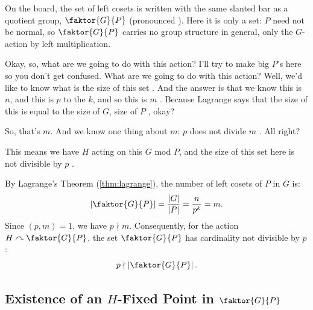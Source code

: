 \begin{proofWrapper}
\begin{aiNote}
On the board, the set of left cosets is written with the same slanted bar as a quotient group, $\faktor{G}{P}$ (pronounced ). Here it is only a set: $P$ need not be normal, so $\faktor{G}{P}$ carries no group structure in general, only the $G$-action by left multiplication.
\end{aiNote}

\begin{speech}[00:22:43 - 00:23:47]
Okay, so, what are we going to do with this action? I'll try to make big $P$'s here so you don't get confused. What are we going to do with this action? Well, we'd like to know what is the size of this set . And the answer is that we know this is $n$, and this is $p$ to the $k$, and so this is $m$ . Because Lagrange says that the size of this is equal to the size of $G$, size of $P$ , okay?

So, that's $m$. And we know one thing about $m$: $p$ does not divide $m$ . All right?

This means we have $H$ acting on this $G$ mod $P$, and the size of this set here is not divisible by $p$ .
\end{speech}

\begin{content}
By Lagrange's Theorem (\cref{thm:lagrange}), the number of left cosets of $P$ in $G$ is:
\[
\left|\faktor{G}{P}\right| = \frac{|G|}{|P|} = \frac{n}{p^k} = m.
\]
Since $(p, m) = 1$, we have $p \nmid m$. Consequently, for the action $H \curvearrowright \faktor{G}{P}$, the set $\faktor{G}{P}$ has cardinality not divisible by $p$:
\begin{equation}\label{eq:p2-gp-not-div-p}
p \nmid \left|\faktor{G}{P}\right|.
\end{equation}
\end{content}

\subsection{Existence of an \texorpdfstring{$H$}{H}-Fixed Point in \texorpdfstring{$\faktor{G}{P}$}{G/P}}


\end{proofWrapper}

